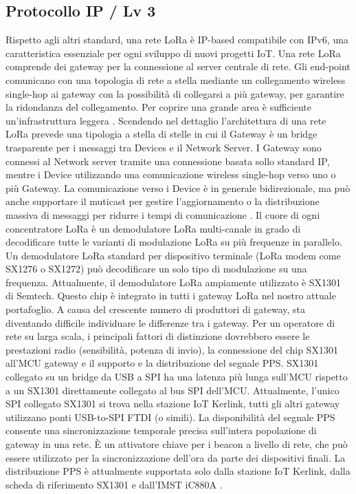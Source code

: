\documentclass[a4paper]{report} %
\begin{document}
\subsection{Protocollo IP / Lv 3} 
Rispetto agli altri standard, una rete LoRa è IP-based compatibile con IPv6, una caratteristica essenziale per ogni sviluppo di nuovi progetti IoT. Una rete LoRa comprende dei gateway per la connessione al server centrale di rete. Gli end-point comunicano con una topologia di rete a stella mediante un collegamento wireless single-hop ai gateway con la possibilità di collegarsi a più gateway, per garantire la ridondanza del collegamento. Per coprire una grande area è sufficiente un'infrastruttura leggera \cite{art:rif.20}. 
Scendendo nel dettaglio l'architettura di una rete LoRa prevede una tipologia a stella di stelle in cui il Gateway è un bridge trasparente per i messaggi tra Devices e il Network Server. I Gateway sono connessi al Network server tramite una connessione basata sollo standard IP, mentre i Device utilizzando una comunicazione wireless single-hop verso uno o più Gateway. La comunicazione verso i Device è in generale bidirezionale, ma può anche supportare il muticast per gestire l'aggiornamento o la distribuzione massiva di messaggi per ridurre i tempi di comunicazione \cite{art:rif.25}.
Il cuore di ogni concentratore LoRa è un demodulatore LoRa multi-canale in grado di decodificare tutte le varianti di modulazione LoRa su più frequenze in parallelo. Un demodulatore LoRa standard per dispositivo terminale (LoRa modem come SX1276 o SX1272) può decodificare un solo tipo di modulazione su una frequenza. Attualmente, il demodulatore LoRa ampiamente utilizzato è SX1301 di Semtech. Questo chip è integrato in tutti i gateway LoRa nel nostro attuale portafoglio. A causa del crescente numero di produttori di gateway, sta diventando difficile individuare le differenze tra i gateway. Per un operatore di rete su larga scala, i principali fattori di distinzione dovrebbero essere le prestazioni radio (sensibilità, potenza di invio), la connessione del chip SX1301 all'MCU gateway e il supporto e la distribuzione del segnale PPS. SX1301 collegato su un bridge da USB a SPI ha una latenza più lunga sull'MCU rispetto a un SX1301 direttamente collegato al bus SPI dell'MCU. Attualmente, l'unico SPI collegato SX1301 si trova nella stazione IoT Kerlink, tutti gli altri gateway utilizzano ponti USB-to-SPI FTDI (o simili). La disponibilità del segnale PPS consente una sincronizzazione temporale precisa sull'intera popolazione di gateway in una rete. È un attivatore chiave per i beacon a livello di rete, che può essere utilizzato per la sincronizzazione dell'ora da parte dei dispositivi finali. La distribuzione PPS è attualmente supportata solo dalla stazione IoT Kerlink, dalla scheda di riferimento SX1301 e dall'IMST iC880A \cite{art:rif.30}. 
\end{document}
